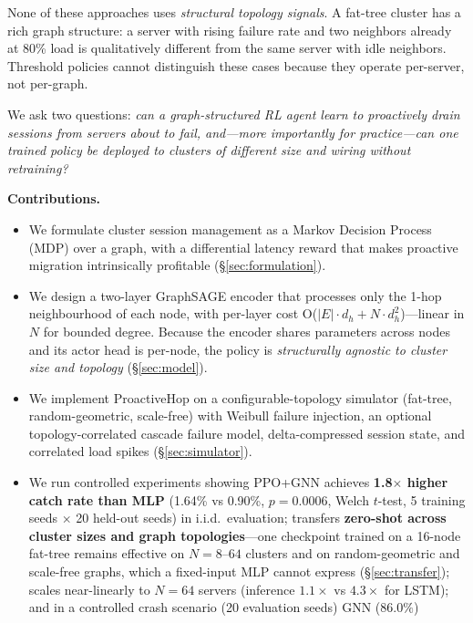 \documentclass[review,1p]{elsarticle}
\theoremstyle{definition}
\begin{document}
None of these approaches uses \emph{structural topology signals}.
A fat-tree cluster has a rich graph structure: a server with rising
failure rate and two neighbors already at 80\% load is qualitatively
different from the same server with idle neighbors.
Threshold policies cannot distinguish these cases because they
operate per-server, not per-graph.

We ask two questions: \emph{can a graph-structured RL agent learn to
proactively drain sessions from servers about to fail, and---more
importantly for practice---can one trained policy be deployed to
clusters of different size and wiring without retraining?}

\textbf{Contributions.}
\begin{itemize}
  \item We formulate cluster session management as a Markov Decision
        Process (MDP) over a graph, with a differential latency reward
        that makes proactive migration intrinsically profitable
        (\S\ref{sec:formulation}).
  \item We design a two-layer GraphSAGE encoder that processes only the
        1-hop neighbourhood of each node, with per-layer cost
        O($|E| \cdot d_h + N \cdot d_h^2$)---linear in $N$ for bounded degree.
        Because the encoder shares parameters across nodes and its actor
        head is per-node, the policy is \emph{structurally agnostic to
        cluster size and topology} (\S\ref{sec:model}).
  \item We implement ProactiveHop on a configurable-topology simulator
        (fat-tree, random-geometric, scale-free) with Weibull failure
        injection, an optional topology-correlated cascade failure model,
        delta-compressed session state, and correlated load spikes
        (\S\ref{sec:simulator}).
  \item We run controlled experiments showing PPO+GNN achieves
        \textbf{1.8$\times$ higher catch rate than MLP} (1.64\% vs 0.90\%,
        $p{=}0.0006$, Welch $t$-test, 5 training seeds $\times$ 20 held-out seeds)
        in i.i.d.\ evaluation; transfers \textbf{zero-shot across cluster
        sizes and graph topologies}---one checkpoint trained on a 16-node
        fat-tree remains effective on $N{=}8$--$64$ clusters and on
        random-geometric and scale-free graphs, which a fixed-input MLP
        cannot express (\S\ref{sec:transfer}); scales near-linearly
        to $N{=}64$ servers (inference $1.1\times$ vs $4.3\times$ for LSTM);
        and in a controlled crash scenario (20 evaluation seeds) GNN ($86.0\%$)

\end{itemize}
\end{document}
